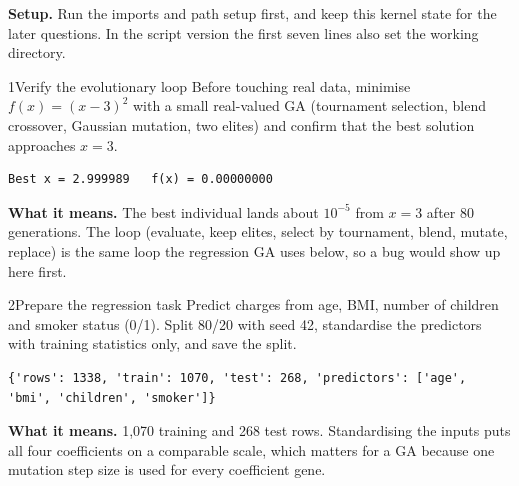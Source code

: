 \textbf{Setup.} Run the imports and path setup first, and keep this kernel state for the later questions. In the script version the first seven lines also set the working directory.



\begin{labquestion}{1}{Verify the evolutionary loop}
Before touching real data, minimise $f(x) = (x-3)^2$ with a small real-valued GA (tournament selection, blend crossover, Gaussian mutation, two elites) and confirm that the best solution approaches $x = 3$.
\end{labquestion}
\begin{labanswer}


\begin{refoutput}
\begin{lstlisting}[style=utpterminal]
Best x = 2.999989   f(x) = 0.00000000
\end{lstlisting}
\end{refoutput}

\textbf{What it means.} The best individual lands about $10^{-5}$ from $x = 3$ after 80 generations. The loop (evaluate, keep elites, select by tournament, blend, mutate, replace) is the same loop the regression GA uses below, so a bug would show up here first.
\end{labanswer}

\begin{labquestion}{2}{Prepare the regression task}
Predict charges from age, BMI, number of children and smoker status (0/1). Split 80/20 with seed 42, standardise the predictors with training statistics only, and save the split.
\end{labquestion}
\begin{labanswer}

\begin{refoutput}
\begin{lstlisting}[style=utpterminal]
{'rows': 1338, 'train': 1070, 'test': 268, 'predictors': ['age', 'bmi', 'children', 'smoker']}
\end{lstlisting}
\end{refoutput}

\textbf{What it means.} 1,070 training and 268 test rows. Standardising the inputs puts all four coefficients on a comparable scale, which matters for a GA because one mutation step size is used for every coefficient gene.
\end{labanswer}

